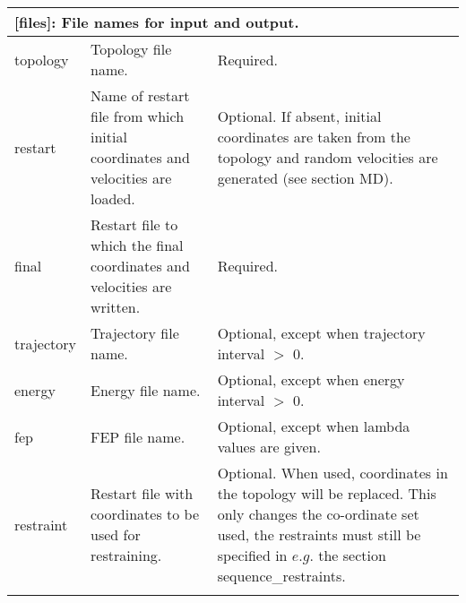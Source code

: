 \documentclass[a4paper,11pt]{article}
\begin{document}
\begin{longtable}{|p{78pt}|p{158pt}|p{158pt}|}
\multicolumn{3}{p{394pt}}{[\textbf{files}]: File names for input and output.}\\
\hline topology &  Topology file name. & Required.\\
\hline restart & Name of restart file from which initial coordinates and velocities are loaded. & Optional. If absent, initial coordinates are taken from the topology and random velocities are generated (see section MD).\\
\hline final & Restart file to which the final coordinates and velocities are written. & Required.\\
\hline trajectory & Trajectory file name. & Optional, except when trajectory interval $>$ 0.\\
\hline energy & Energy file name. & Optional, except when energy interval $>$ 0.\\
\hline fep & FEP file name. & Optional, except when lambda values are given.\\
\hline restraint & Restart file with coordinates to be used for restraining. & Optional. When used, coordinates in the topology will be replaced. This only changes the co-ordinate set used, the restraints must still be specified in $e.g.$ the section sequence\_restraints.\\
\hline
\multicolumn{3}{p{394pt}}{}\\


\end{longtable}
\end{document}
